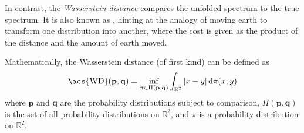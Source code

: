 In contrast,
the \emph{Wasserstein distance} \cite{wd}
compares the unfolded spectrum to the true spectrum.
%
It is also known as ,
  hinting at the analogy of moving earth to transform one distribution into another,
    where the cost is given as the product of the distance and the amount of earth moved.

Mathematically, the Wasserstein distance (of first kind) can be defined as
\begin{equation}
  \text{\acs{WD}}(\mathbf{p}, \mathbf{q}) = \inf_{\pi \in \Pi(\mathbf{p}, \mathbf{q})} \int_{\mathbb{R}^2} |x - y| \, \mathrm{d}\pi(x, y)
\end{equation}
where
  $\mathbf{p}$ and $\mathbf{q}$ are the probability distributions subject to comparison,
  $\Pi(\mathbf{p}, \mathbf{q})$ is the set of all probability distributions on $\mathbb{R}^2$,
  and $\pi$ is a probability distribution on $\mathbb{R}^2$.
